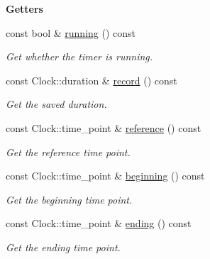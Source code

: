 \begin{Indent}{\bf Getters}\par
\begin{DoxyCompactItemize}
\item 
const bool \& \hyperlink{exceptionmagrathea_1_1Timer_a0b3f41a0ad4242f465f096a39d4d9009}{running} () const 
\begin{DoxyCompactList}\small\item\em Get whether the timer is running. \end{DoxyCompactList}\item 
const Clock\-::duration \& \hyperlink{exceptionmagrathea_1_1Timer_ae51eb0a72eff6505564120765f7f5a97}{record} () const 
\begin{DoxyCompactList}\small\item\em Get the saved duration. \end{DoxyCompactList}\item 
const Clock\-::time\-\_\-point \& \hyperlink{exceptionmagrathea_1_1Timer_a0da629c75fa145b8bd28b8e913b1561e}{reference} () const 
\begin{DoxyCompactList}\small\item\em Get the reference time point. \end{DoxyCompactList}\item 
const Clock\-::time\-\_\-point \& \hyperlink{exceptionmagrathea_1_1Timer_a2b761324b0c76873464a3f2e015c171f}{beginning} () const 
\begin{DoxyCompactList}\small\item\em Get the beginning time point. \end{DoxyCompactList}\item 
const Clock\-::time\-\_\-point \& \hyperlink{exceptionmagrathea_1_1Timer_affe899a3821a020dbef1ce2f3737c8ad}{ending} () const 
\begin{DoxyCompactList}\small\item\em Get the ending time point. \end{DoxyCompactList}\end{DoxyCompactItemize}
\end{Indent}
